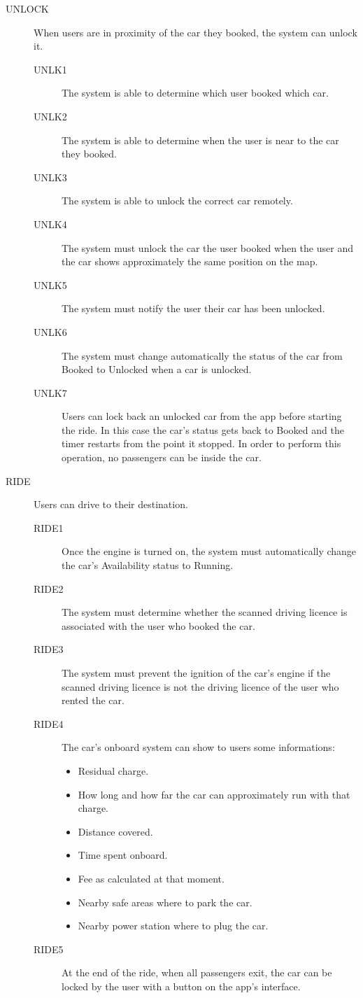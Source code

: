 \documentclass[11pt]{article} %
\begin{document}
\begin{description}
 	\item[UNLOCK] When users are in proximity of the car they booked, the system can unlock it.
	\begin{description}
	\item[UNLK1] The system is able to determine which user booked which car.
	\item[UNLK2] The system is able to determine when the user is near to the car they booked.
	\item[UNLK3] The system is able to unlock the correct car remotely.
	\item[UNLK4] The system must unlock the car the user booked when the user and the car shows approximately the same position on the map.
	\item[UNLK5] The system must notify the user their car has been unlocked.
	\item[UNLK6] The system must change automatically the status of the car from Booked to Unlocked when a car is unlocked.
	\item[UNLK7] Users can lock back an unlocked car from the app before starting the ride. In this case the car's status gets back to Booked and the timer restarts from the point it stopped. In order to perform this operation, no passengers can be inside the car.
	\end{description}

	\item[RIDE] Users can drive to their destination.
	\begin{description}
	\item[RIDE1] Once the engine is turned on, the system must automatically change the car's Availability status to Running.
	\item[RIDE2] The system must determine whether the scanned driving licence is associated with the user who booked the car.
	\item[RIDE3] The system must prevent the ignition of the car's engine if the scanned driving licence is not the driving licence of the user who rented the car.
	\item[RIDE4] The car's onboard system can show to users some informations:
	\begin{itemize}
		\item Residual charge.
		\item How long and how far the car can approximately run with that charge.
		\item Distance covered.
		\item Time spent onboard.
		\item Fee as calculated at that moment.
		\item Nearby safe areas where to park the car.
		\item Nearby power station where to plug the car.
	\end{itemize}
	\item[RIDE5] At the end of the ride, when all passengers exit, the car can be locked by the user with a button on the app's interface.
 	\end{description}


\end{description}
\end{document}
